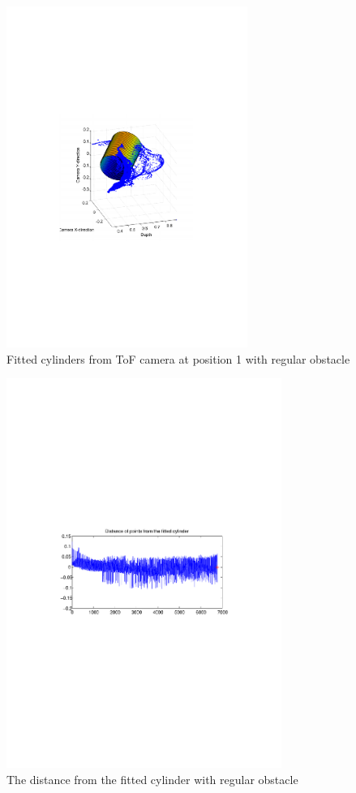 \begin{figure}[htbp]
    \centering
    \includegraphics[width=0.7\textwidth]{pics/pos1-regular-tof-3d}
    \caption{Fitted cylinders from ToF camera at position 1 with regular obstacle}
    \label{chap7:fig-pos1-regular-tof-3d}
\end{figure}
\begin{figure}[htbp]
    \centering
    \includegraphics[width=0.8\textwidth]{pics/pos1-regular-tof-dist}
    \caption{The distance from the fitted cylinder with regular obstacle}
    \label{chap7:fig-pos1-regular-tof-dits}
\end{figure}
